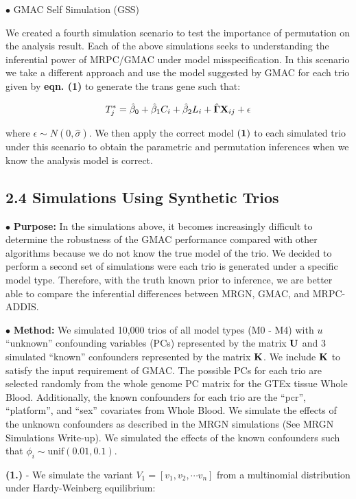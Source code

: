 \documentclass[
]{article}
\begin{document}
\indent \(\bullet\) GMAC Self Simulation (GSS)

We created a fourth simulation scenario to test the importance of
permutation on the analysis result. Each of the above simulations seeks
to understanding the inferential power of MRPC/GMAC under model
misspecification. In this scenario we take a different approach and use
the model suggested by GMAC for each trio given by \textbf{eqn. (1)} to
generate the trans gene such that:

\[ T_j^{\ast} = \hat{\beta}_0 + \hat{\beta}_1 C_i + \hat{\beta}_2 L_i + \hat{{\bf \Gamma}} {\bf X}_{ij} + \epsilon  \]

where \(\epsilon \sim N(0, \hat{\sigma})\). We then apply the correct
model \({\bf (1)}\) to each simulated trio under this scenario to obtain
the parametric and permutation inferences when we know the analysis
model is correct.

\subsection*{2.4 Simulations Using Synthetic Trios}

\indent \(\bullet\) \textbf{Purpose:} In the simulations above, it
becomes increasingly difficult to determine the robustness of the GMAC
performance compared with other algorithms because we do not know the
true model of the trio. We decided to perform a second set of
simulations were each trio is generated under a specific model type.
Therefore, with the truth known prior to inference, we are better able
to compare the inferential differences between MRGN, GMAC, and
MRPC-ADDIS.

\indent \(\bullet\) \textbf{Method:} We simulated 10,000 trios of all
model types (M0 - M4) with \(u\) ``unknown'' confounding variables (PCs)
represented by the matrix \({\bf U}\) and 3 simulated ``known''
confounders represented by the matrix \({\bf K}\). We include
\({\bf K}\) to satisfy the input requirement of GMAC. The possible PCs
for each trio are selected randomly from the whole genome PC matrix for
the GTEx tissue Whole Blood. Additionally, the known confounders for
each trio are the ``pcr'', ``platform'', and ``sex'' covariates from
Whole Blood. We simulate the effects of the unknown confounders as
described in the MRGN simulations (See MRGN Simulations Write-up). We
simulated the effects of the known confounders such that
\(\phi_i\sim \text{unif}(0.01, 0.1)\).

\noindent \textbf{(1.)} - We simulate the variant
\(V_1 = [v_1, v_2, \cdots v_n]\) from a multinomial distribution under
Hardy-Weinberg equilibrium:
\end{document}
